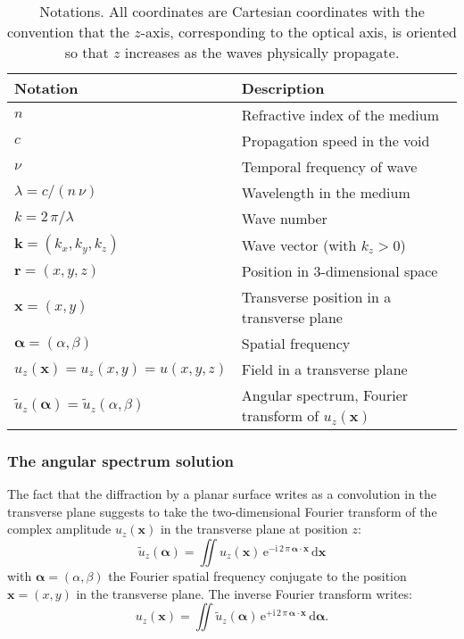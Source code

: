\documentclass[a4paper]{article}
\newcommand{\V}[1]{\boldsymbol{#1}}
\newcommand*{\mathd}{\mathrm{d}}
\newcommand*{\mathe}{\mathrm{e}}
\newcommand*{\mathi}{\mathrm{i}}
\newcommand*{\FT}[1]{\widetilde{#1}}
\begin{document}
\begin{table}[t]
  \centering
  \begin{tabular}{ll}
    Notation & Description \\
    \hline
    $n$ & Refractive index of the medium\\
    $c$ & Propagation speed in the void\\
    $ν$ & Temporal frequency of wave\\
    $λ= c/(n\,ν)$ & Wavelength in the medium\\
    $k = 2\,π/λ$ & Wave number\\
    $\V{k} = (k_{x},k_{y},k_{z})$ & Wave vector (with $k_{z} > 0$)\\
    $\V{r} = (x,y,z)$ & Position in 3-dimensional space\\
    $\V{x} = (x,y)$ & Transverse position in a transverse plane\\
    $\V{α} = (α,β)$ & Spatial frequency\\
    $u_{z}(\V{x}) = u_{z}(x,y) = u(x,y,z)$ & Field in a transverse plane\\
    $\FT{u}_{z}(\V{α}) = \FT{u}_{z}(α,β)$
             & Angular spectrum, Fourier transform of $u_{z}(\V{x})$\\
  \end{tabular}
  \caption{Notations. All coordinates are Cartesian coordinates with the
    convention that the $z$-axis, corresponding to the optical axis, is
    oriented so that $z$ increases as the waves physically propagate.}
  \label{tab:notations}
\end{table}


\subsubsection{The angular spectrum solution}
\label{sec:angular-spectrum}

The fact that the diffraction by a planar surface writes as a convolution in
the transverse plane suggests to take the two-dimensional Fourier transform of
the complex amplitude $u_{z}(\V{x})$ in the transverse plane at position $z$:
\begin{equation}
  \label{eq:angular-spectrum}
  \FT{u}_{z}(\V{α}) = \iint u_{z}(\V{x})\,
  \mathe^{-\mathi\,2\,π\,\V{α}·\V{x}}\,
  \mathd\V{x}
\end{equation}
with $\V{α} = (α,β)$ the Fourier spatial frequency conjugate to the position
$\V{x} = (x,y)$ in the transverse plane. The inverse Fourier transform writes:
\begin{equation}
  \label{eq:angular-spectrum-inverse}
  u_{z}(\V{x}) = \iint \FT{u}_{z}(\V{α})\,
  \mathe^{+\mathi\,2\,π\,\V{α}·\V{x}}\,
  \mathd\V{α}.
\end{equation}
\end{document}
